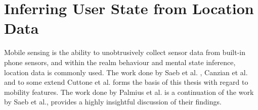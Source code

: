 \section{Inferring User State from Location Data}





Mobile sensing is the ability to unobtrusively collect sensor data from built-in phone sensors, and within the realm behaviour and mental state inference, location data is commonly used. The work done by Saeb et al. \cite{Saeb2015}, Canzian et al. \cite{Canzian2015}  and to some extend Cuttone et al. \cite{sparse-location-2014} forms the basis of this thesis with regard to mobility features. The work done by Palmius et al. \cite{palmius2017} is a continuation of the work by Saeb et al., provides a highly insightful discussion of their findings.\\

